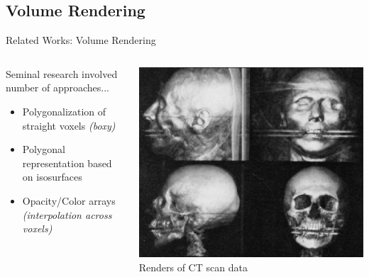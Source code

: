 \documentclass[10pt,compress,professionalfont]{beamer}
\begin{document}
\subsection{Volume Rendering}
\begin{frame}{Related Works: Volume Rendering}

    \begin{columns}
        \begin{column}{0.6\textwidth}

    \vspace{-10mm}

    Seminal research involved number of approaches...
    
    \begin{itemize}
        \item Polygonalization of straight voxels \textit{(boxy)}\\
        \vspace{4mm}

        \item Polygonal representation based on isosurfaces\\
        \vspace{4mm}

        \item Opacity/Color arrays \textit{(interpolation across voxels)}\\
    \end{itemize}

        \end{column}
        \begin{column}{0.4\textwidth}
            \vspace{-4mm}
            \includegraphics[width=\textwidth]{../img/external/img188}\\
            {\centering\scriptsize Renders of CT scan data\\}
        \end{column}
    \end{columns}
\end{frame}
\end{document}
